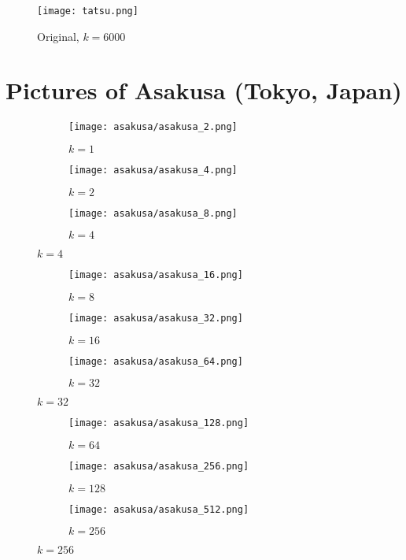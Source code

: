 \documentclass{article}
\begin{document}
\begin{figure}[H]
  \centering
  \texttt{[image: tatsu.png]}
  \caption{Original, $k=6000$}
\end{figure}
\clearpage

\section{Pictures of Asakusa (Tokyo, Japan)}
\begin{figure}[H]
  \begin{subfigure}{.32\textwidth}
    \centering
    \texttt{[image: asakusa/asakusa\_2.png]}
    \caption{$k=1$}
  \end{subfigure}
  \begin{subfigure}{.32\textwidth}
    \centering
    \texttt{[image: asakusa/asakusa\_4.png]}
    \caption{$k=2$}
  \end{subfigure}
  \begin{subfigure}{.32\textwidth}
    \centering
    \texttt{[image: asakusa/asakusa\_8.png]}
    \caption{$k=4$}
  \end{subfigure}
\end{figure}
\begin{figure}[H]
  \begin{subfigure}{.32\textwidth}
    \centering
    \texttt{[image: asakusa/asakusa\_16.png]}
    \caption{$k=8$}
  \end{subfigure}
  \begin{subfigure}{.32\textwidth}
    \centering
    \texttt{[image: asakusa/asakusa\_32.png]}
    \caption{$k=16$}
  \end{subfigure}
  \begin{subfigure}{.32\textwidth}
    \centering
    \texttt{[image: asakusa/asakusa\_64.png]}
    \caption{$k=32$}
  \end{subfigure}
\end{figure}
\begin{figure}[H]
  \begin{subfigure}{.32\textwidth}
    \centering
    \texttt{[image: asakusa/asakusa\_128.png]}
    \caption{$k=64$}
  \end{subfigure}
  \begin{subfigure}{.32\textwidth}
    \centering
    \texttt{[image: asakusa/asakusa\_256.png]}
    \caption{$k=128$}
  \end{subfigure}
  \begin{subfigure}{.32\textwidth}
    \centering
    \texttt{[image: asakusa/asakusa\_512.png]}
    \caption{$k=256$}
  \end{subfigure}
\end{figure}
\end{document}
